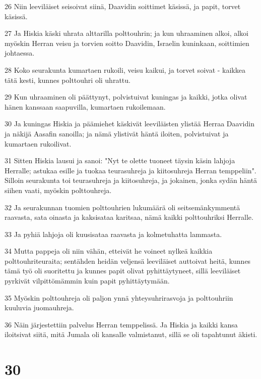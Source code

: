 \par 26 Niin leeviläiset seisoivat siinä, Daavidin soittimet käsissä, ja papit, torvet käsissä.
\par 27 Ja Hiskia käski uhrata alttarilla polttouhrin; ja kun uhraaminen alkoi, alkoi myöskin Herran veisu ja torvien soitto Daavidin, Israelin kuninkaan, soittimien johtaessa.
\par 28 Koko seurakunta kumartaen rukoili, veisu kaikui, ja torvet soivat - kaikkea tätä kesti, kunnes polttouhri oli uhrattu.
\par 29 Kun uhraaminen oli päättynyt, polvistuivat kuningas ja kaikki, jotka olivat hänen kanssaan saapuvilla, kumartaen rukoilemaan.
\par 30 Ja kuningas Hiskia ja päämiehet käskivät leeviläisten ylistää Herraa Daavidin ja näkijä Aasafin sanoilla; ja nämä ylistivät häntä iloiten, polvistuivat ja kumartaen rukoilivat.
\par 31 Sitten Hiskia lausui ja sanoi: "Nyt te olette tuoneet täysin käsin lahjoja Herralle; astukaa esille ja tuokaa teurasuhreja ja kiitosuhreja Herran temppeliin". Silloin seurakunta toi teurasuhreja ja kiitosuhreja, ja jokainen, jonka sydän häntä siihen vaati, myöskin polttouhreja.
\par 32 Ja seurakunnan tuomien polttouhrien lukumäärä oli seitsemänkymmentä raavasta, sata oinasta ja kaksisataa karitsaa, nämä kaikki polttouhriksi Herralle.
\par 33 Ja pyhiä lahjoja oli kuusisataa raavasta ja kolmetuhatta lammasta.
\par 34 Mutta pappeja oli niin vähän, etteivät he voineet nylkeä kaikkia polttouhriteuraita; sentähden heidän veljensä leeviläiset auttoivat heitä, kunnes tämä työ oli suoritettu ja kunnes papit olivat pyhittäytyneet, sillä leeviläiset pyrkivät vilpittömämmin kuin papit pyhittäytymään.
\par 35 Myöskin polttouhreja oli paljon ynnä yhteysuhrirasvoja ja polttouhriin kuuluvia juomauhreja.
\par 36 Näin järjestettiin palvelus Herran temppelissä. Ja Hiskia ja kaikki kansa iloitsivat siitä, mitä Jumala oli kansalle valmistanut, sillä se oli tapahtunut äkisti.

\chapter{30}

